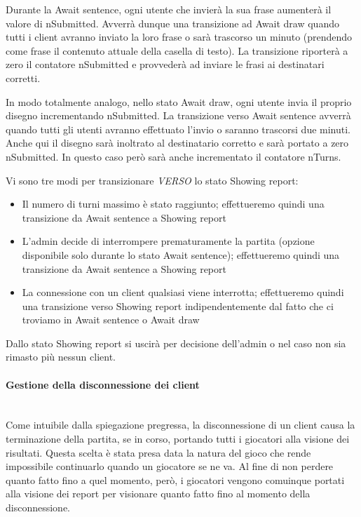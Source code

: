 \noindent Durante la Await sentence, ogni utente che invierà la sua frase aumenterà il valore di nSubmitted. Avverrà dunque una transizione ad Await draw quando tutti i client avranno inviato la loro frase o sarà trascorso un minuto (prendendo come frase il contenuto attuale della casella di testo). La transizione riporterà a zero il contatore nSubmitted e provvederà ad inviare le frasi ai destinatari corretti.\newline

\noindent In modo totalmente analogo, nello stato Await draw, ogni utente invia il proprio disegno incrementando nSubmitted. La transizione verso Await sentence avverrà quando tutti gli utenti avranno effettuato l'invio o saranno trascorsi due minuti. Anche qui il disegno sarà inoltrato al destinatario corretto e sarà portato a zero nSubmitted. In questo caso però sarà anche incrementato il contatore nTurns.\newline

\noindent Vi sono tre modi per transizionare \emph{VERSO} lo stato Showing report:
\begin{itemize}
    \item Il numero di turni massimo è stato raggiunto; effettueremo quindi una transizione da Await sentence a Showing report
    \item L'admin decide di interrompere prematuramente la partita (opzione disponibile solo durante lo stato Await sentence); effettueremo quindi una transizione da Await sentence a Showing report
    \item La connessione con un client qualsiasi viene interrotta; effettueremo quindi una transizione verso Showing report indipendentemente dal fatto che ci troviamo in Await sentence o Await draw
\end{itemize}

\noindent Dallo stato Showing report si uscirà per decisione dell'admin o nel caso non sia rimasto più nessun client.

\paragraph{Gestione della disconnessione dei client}\mbox{}\\
Come intuibile dalla spiegazione pregressa, la disconnessione di un client causa la terminazione della partita, se in corso, portando tutti i giocatori alla visione dei risultati.\newline
Questa scelta è stata presa data la natura del gioco che rende impossibile continuarlo quando un giocatore se ne va.\newline
Al fine di non perdere quanto fatto fino a quel momento, però, i giocatori vengono comuinque portati alla visione dei report per visionare quanto fatto fino al momento della disconnessione.


